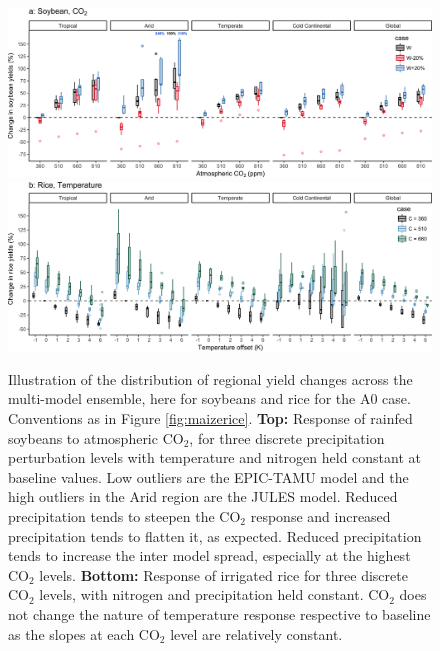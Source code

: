 \documentclass[gmd, manuscript]{copernicus} %
\begin{document}
\begin{figure}[ht]
  \centering
  \includegraphics[width=15cm]{figures/soy_sim_CG_C.png}
  \includegraphics[width=15cm]{figures/rice_sim_CG_T.png}
  \caption{
  Illustration of the distribution of regional yield changes across the multi-model ensemble, here for soybeans and rice for the A0 case. Conventions as in Figure \ref{fig:maizerice}.
  \textbf{Top:} 
  Response of rainfed soybeans to atmospheric CO$_2$, for three discrete precipitation perturbation levels with temperature and nitrogen held constant at baseline values.
  Low outliers are the EPIC-TAMU model and the high outliers in the Arid region are the JULES model.
  Reduced precipitation tends to steepen the CO$_2$ response and increased precipitation tends to flatten it, as expected. 
  Reduced precipitation tends to increase the inter model spread, especially at the highest CO$_2$ levels.
  \textbf{Bottom:} 
  Response of irrigated rice for three discrete CO$_2$ levels, with nitrogen and precipitation held constant. 
  CO$_2$ does not change the nature of temperature response respective to baseline as the slopes at each CO$_2$ level are relatively constant.
  }
  \label{fig:soywheat}
\end{figure}
\end{document}
